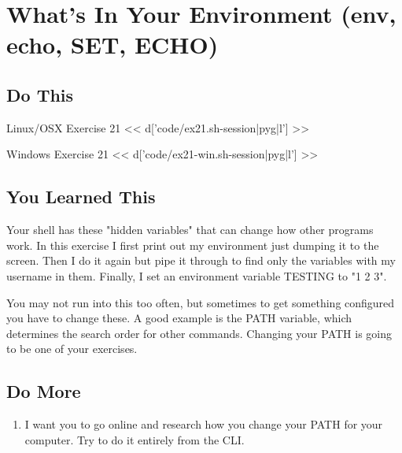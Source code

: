 \chapter{What's In Your Environment (env, echo, SET, ECHO)}

\section{Do This}

\begin{code}{Linux/OSX Exercise 21}
<< d['code/ex21.sh-session|pyg|l'] >>
\end{code}

\begin{code}{Windows Exercise 21}
<< d['code/ex21-win.sh-session|pyg|l'] >>
\end{code}

\section{You Learned This}

Your shell has these "hidden variables" that can change how other programs work.
In this exercise I first print out my environment just dumping it to the screen.
Then I do it again but pipe it through  to find only the variables
with my username in them.  Finally, I set an environment variable TESTING to "1 2 3".

You may not run into this too often, but sometimes to get something configured
you have to change these.  A good example is the PATH variable, which determines
the search order for other commands.  Changing your PATH is going to be one
of your exercises.


\section{Do More}

\begin{enumerate}
\item I want you to go online and research how you change your PATH for your computer.  Try to do it entirely from the CLI.
\end{enumerate}

